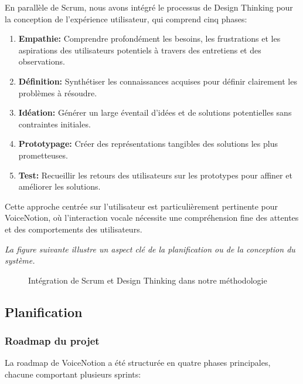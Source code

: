 En parallèle de Scrum, nous avons intégré le processus de Design Thinking pour la conception de l'expérience utilisateur, qui comprend cinq phases:

\begin{enumerate}
    \item \textbf{Empathie:} Comprendre profondément les besoins, les frustrations et les aspirations des utilisateurs potentiels à travers des entretiens et des observations.
    
    \item \textbf{Définition:} Synthétiser les connaissances acquises pour définir clairement les problèmes à résoudre.
    
    \item \textbf{Idéation:} Générer un large éventail d'idées et de solutions potentielles sans contraintes initiales.
    
    \item \textbf{Prototypage:} Créer des représentations tangibles des solutions les plus prometteuses.
    
    \item \textbf{Test:} Recueillir les retours des utilisateurs sur les prototypes pour affiner et améliorer les solutions.
\end{enumerate}

Cette approche centrée sur l'utilisateur est particulièrement pertinente pour VoiceNotion, où l'interaction vocale nécessite une compréhension fine des attentes et des comportements des utilisateurs.

\noindent
\textit{La figure suivante illustre un aspect clé de la planification ou de la conception du système.}
\begin{figure}[H]
    \centering
    \caption{Intégration de Scrum et Design Thinking dans notre méthodologie}
    \label{fig:agile_design_thinking}
\end{figure}

\subsection{Planification}

\subsubsection{Roadmap du projet}

La roadmap de VoiceNotion a été structurée en quatre phases principales, chacune comportant plusieurs sprints:

